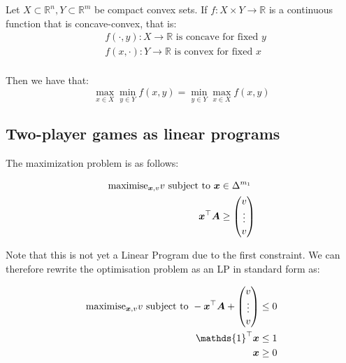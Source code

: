 \begin{theorem}
	Let $X \subset \mathbb{R}^n, Y \subset \mathbb{R}^m$ be compact convex
	sets. If $f:X\times Y \rightarrow \mathbb{R}$ is a continuous function that
	is concave-convex, that is:
	\begin{equation*}
		\begin{split}
			& f(\cdot,y): X \rightarrow \mathbb{R} \text{ is concave for fixed } y \\
			& f(x,\cdot): Y \rightarrow \mathbb{R} \text{ is convex for fixed } x \\
		\end{split}
	\end{equation*}

	Then we have that:
	\begin{equation}
		\max_{x \in X} \min_{y \in Y} f(x,y) = \min_{y \in Y} \max_{x \in X}
		f(x,y)
	\end{equation}
\end{theorem}

\subsection{Two-player games as linear programs}

The maximization problem is as follows:

\begin{equation}
	\begin{split}
		\text{maximise}_{\bm{x},v} v \text{ subject to } \bm{x} & \in \Delta^{m_1} \\
		\bm{x}^\top \bm{A} & \ge \begin{pmatrix}
			v \\
			\vdots \\
			v
		\end{pmatrix}
	\end{split}
\end{equation}

Note that this is not yet a Linear Program due to the first constraint. We can
therefore rewrite the optimisation problem as an LP in standard form as:

\begin{equation}
	\begin{split}
		\text{maximise}_{\vect{x},v} v \text{ subject to }
		-\vect{x}^\top \vect{A} + \begin{pmatrix}
			v \\
			\vdots \\
			v
		\end{pmatrix} & \le 0 \\
		\mathds{1}^\top \vect{x} & \le 1 \\
		\vect{x} & \ge 0
	\end{split}
\end{equation}

